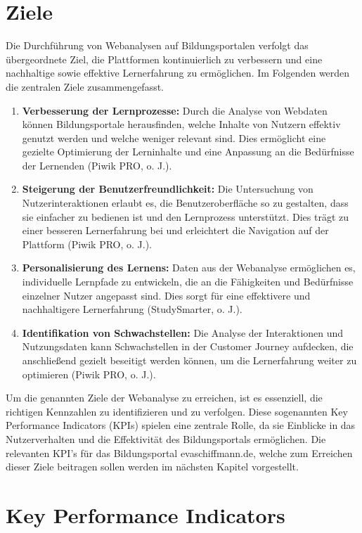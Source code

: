 \section{Ziele} %
Die Durchführung von Webanalysen auf Bildungsportalen verfolgt das übergeordnete Ziel, die Plattformen kontinuierlich zu verbessern und eine nachhaltige sowie effektive Lernerfahrung zu ermöglichen. Im Folgenden werden die zentralen Ziele zusammengefasst.
\begin{enumerate}
    \item \textbf{Verbesserung der Lernprozesse:}
    Durch die Analyse von Webdaten können Bildungsportale herausfinden, welche Inhalte von Nutzern effektiv genutzt werden und welche weniger relevant sind. Dies ermöglicht eine gezielte Optimierung der Lerninhalte und eine Anpassung an die Bedürfnisse der Lernenden (Piwik PRO, o. J.).
    \item \textbf{Steigerung der Benutzerfreundlichkeit:}
    Die Untersuchung von Nutzerinteraktionen erlaubt es, die Benutzeroberfläche so zu gestalten, dass sie einfacher zu bedienen ist und den Lernprozess unterstützt. Dies trägt zu einer besseren Lernerfahrung bei und erleichtert die Navigation auf der Plattform (Piwik PRO, o. J.).
    \item \textbf{Personalisierung des Lernens:}
    Daten aus der Webanalyse ermöglichen es, individuelle Lernpfade zu entwickeln, die an die Fähigkeiten und Bedürfnisse einzelner Nutzer angepasst sind. Dies sorgt für eine effektivere und nachhaltigere Lernerfahrung (StudySmarter, o. J.).
    \item \textbf{Identifikation von Schwachstellen:} Die Analyse der Interaktionen und Nutzungsdaten kann Schwachstellen in der Customer Journey aufdecken, die anschließend gezielt beseitigt werden können, um die Lernerfahrung weiter zu optimieren (Piwik PRO, o. J.).
\end{enumerate}
Um die genannten Ziele der Webanalyse zu erreichen, ist es essenziell, die richtigen Kennzahlen zu identifizieren und zu verfolgen. Diese sogenannten Key Performance Indicators (KPIs) spielen eine zentrale Rolle, da sie Einblicke in das Nutzerverhalten und die Effektivität des Bildungsportals ermöglichen. Die relevanten KPI's für das Bildungsportal evaschiffmann.de, welche zum Erreichen dieser Ziele beitragen sollen werden im nächsten Kapitel vorgestellt.

\section{Key Performance Indicators} %

